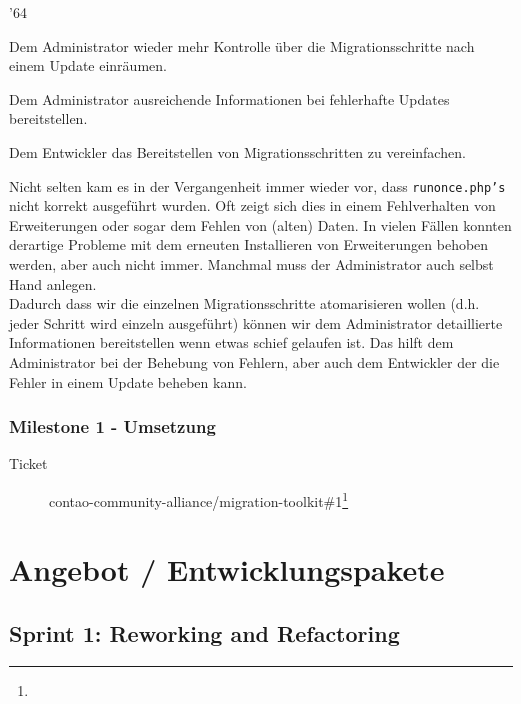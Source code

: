 \documentclass[
paper=a4,
draft=false,%
fontsize=10pt%
]{scrartcl}
\begin{document}
\begin{dinglist}{'64}
\item Dem Administrator wieder mehr Kontrolle über die Migrationsschritte nach einem Update einräumen.
\item Dem Administrator ausreichende Informationen bei fehlerhafte Updates bereitstellen.
\item Dem Entwickler das Bereitstellen von Migrationsschritten zu vereinfachen.
\end{dinglist}

Nicht selten kam es in der Vergangenheit immer wieder vor, dass \texttt{runonce.php's} nicht korrekt ausgeführt wurden. Oft zeigt sich dies in einem Fehlverhalten von Erweiterungen oder sogar dem Fehlen von (alten) Daten. In vielen Fällen konnten derartige Probleme mit dem erneuten Installieren von Erweiterungen behoben werden, aber auch nicht immer. Manchmal muss der Administrator auch selbst Hand anlegen.\\
Dadurch dass wir die einzelnen Migrationsschritte atomarisieren wollen (d.h. jeder Schritt wird einzeln ausgeführt) können wir dem Administrator detaillierte Informationen bereitstellen wenn etwas schief gelaufen ist. Das hilft dem Administrator bei der Behebung von Fehlern, aber auch dem Entwickler der die Fehler in einem Update beheben kann.

\subsubsection{Milestone 1 - Umsetzung}
\label{subsec:mtk-milestone-1}

\begin{description}
\item[Ticket] contao-community-alliance/migration-toolkit\#1\footnote{}
\end{description}

\newpage

%
%

\section{Angebot / Entwicklungspakete}
\label{sec:offer}

\subsection{Sprint 1: Reworking and Refactoring}
\label{subsec:sprint-1}
\end{document}
